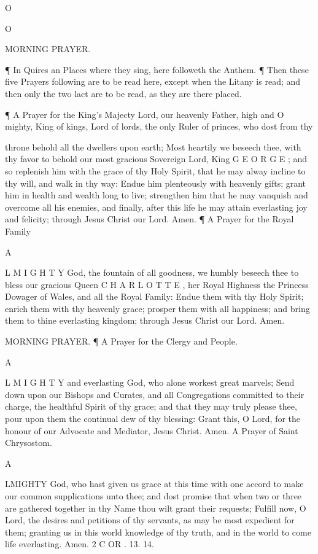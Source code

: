 O

O

MORNING PRAYER.

¶ In Quires an Places where they sing, here followeth the Anthem. ¶ Then these five Prayers following are to be read here, except when the Litany is read; and then only the two lact are to be read, as they are there placed.

¶ A Prayer for the King’s Majecty Lord, our heavenly Father, high and O mighty, King of kings, Lord of lords, the only Ruler of princes, who dost from thy

throne behold all the dwellers upon earth; Most heartily we beseech thee, with thy favor to behold our most gracious Sovereign Lord, King G E O R G E ; and so replenish him with the grace of thy Holy Spirit, that he may alway incline to thy will, and walk in thy way: Endue him plenteously with heavenly gifts; grant him in health and wealth long to live; strengthen him that he may vanquish and overcome all his enemies, and finally, after this life he may attain everlasting joy and felicity; through Jesus Christ our Lord. Amen. ¶ A Prayer for the Royal Family

A

L M I G H T Y God, the fountain of all goodness, we humbly beseech thee to bless our gracious Queen C H A R L O T T E , her Royal Highness the Princess Dowager of Wales, and all the Royal Family: Endue them with thy Holy Spirit; enrich them with thy heavenly grace; prosper them with all happiness; and bring them to thine everlasting kingdom; through Jesus Christ our Lord. Amen.

MORNING PRAYER. ¶ A Prayer for the Clergy and People.

A

L M I G H T Y and everlasting God, who alone workest great marvels; Send down upon our Bishops and Curates, and all Congregations committed to their charge, the healthful Spirit of thy grace; and that they may truly please thee, pour upon them the continual dew of thy blessing: Grant this, O Lord, for the honour of our Advocate and Mediator, Jesus Christ. Amen. A Prayer of Saint Chrysostom.

A

LMIGHTY God, who hast given us grace at this time with one accord to make our common supplications unto thee; and dost promise that when two or three are gathered together in thy Name thou wilt grant their requests; Fulfill now, O Lord, the desires and petitions of thy servants, as may be most expedient for them; granting us in this world knowledge of thy truth, and in the world to come life everlasting. Amen. 2 C OR . 13. 14.

